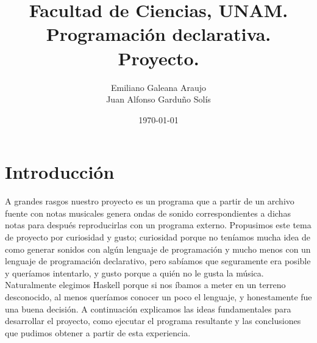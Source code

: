 \documentclass[10pt,a4paper]{article}
\title{Facultad de Ciencias, UNAM.\\Programación declarativa.\\ Proyecto.}
\author{Emiliano Galeana Araujo\\ Juan Alfonso Garduño Solís}
\date{\small{\today}}
\begin{document}
\maketitle
\section{Introducción}
\noindent A grandes rasgos nuestro proyecto es un programa que a partir de un
archivo fuente con notas musicales genera ondas de sonido correspondientes a
dichas notas  para después reproducirlas con un programa externo. Propusimos este
tema de proyecto por curiosidad y gusto; curiosidad porque no teníamos mucha idea
de como generar sonidos con algún lenguaje de programación y mucho menos con un
lenguaje de programación declarativo, pero sabíamos que seguramente era posible y
queríamos intentarlo, y gusto porque a quién no le gusta la música. Naturalmente
elegimos Haskell porque si nos íbamos a meter en un terreno desconocido, al menos
queríamos conocer un poco el lenguaje, y honestamente fue una buena decisión. A
continuación explicamos las ideas fundamentales para desarrollar el proyecto,
como ejecutar el programa resultante y las conclusiones que pudimos obtener a
partir de esta experiencia.
\end{document}
